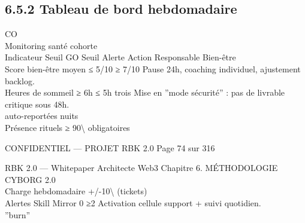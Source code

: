 \subsection{6.5.2 Tableau de bord hebdomadaire}
CO\\
Monitoring santé cohorte\\
\vspace{0.5em}
\vspace{0.5em}
\vspace{0.5em}
Indicateur                    Seuil GO         Seuil Alerte    Action Responsable Bien-être\\
Score bien-être moyen         ≤ 5/10             ≥ 7/10        Pause 24h, coaching individuel, ajustement backlog.\\
Heures de sommeil               ≥ 6h           ≤ 5h trois      Mise en ”mode sécurité” : pas de livrable critique sous 48h.\\
auto-reportées                                    nuits\\
Présence rituels               ≥ 90\textbackslash{}%
obligatoires\\
\vspace{0.5em}
\vspace{0.5em}
\vspace{0.5em}
\vspace{0.5em}
\begin{confidential}CONFIDENTIEL — PROJET RBK 2.0                                        Page 74 sur 316\end{confidential}
RBK 2.0 — Whitepaper Architecte Web3                                                                 Chapitre 6. MÉTHODOLOGIE CYBORG 2.0\\
\vspace{0.5em}
\vspace{0.5em}
\vspace{0.5em}
Charge hebdomadaire    +/-10\textbackslash{}%
(tickets)\\
Alertes Skill Mirror        0            ≥2         Activation cellule support + suivi quotidien.\\
”burn”\\
\vspace{0.5em}
\vspace{0.5em}
